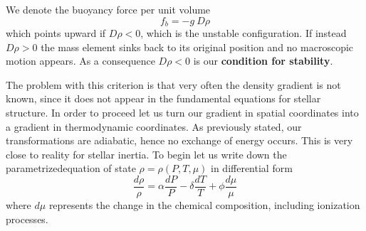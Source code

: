 We denote the buoyancy force per unit volume 
$$
f_b=- g \ D \rho
$$
which points upward if $D \rho < 0$, which is the unstable configuration. If instead $D \rho > 0$ the mass element sinks back to its original position and no macroscopic motion appears. As a consequence $D \rho<0$ is our \textbf{condition for stability}.

The problem with this criterion is that very often the density gradient is not known, since it does not appear in the fundamental equations for stellar structure. In order to proceed let us turn our gradient in spatial coordinates into a gradient in thermodynamic coordinates. As previously stated, our transformations are adiabatic, hence no exchange of energy occurs. This is very close to reality for stellar inertia. To begin let us write down the parametrizedequation of state $\rho = \rho (P, T, \mu)$ in differential form
\begin{equation}\label{eq:EoSdiff}
	\frac{d \rho}{\rho} = \alpha \frac{d P}{P} - \delta \frac{d T}{T} + \phi \frac{d \mu}{\mu}
\end{equation}
where $d \mu$ represents the change in the chemical composition, including ionization processes. 

